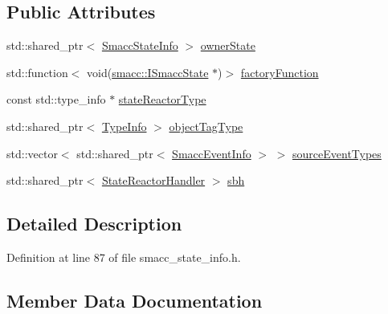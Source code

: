 \subsection*{Public Attributes}
\begin{DoxyCompactItemize}
\item 
std\+::shared\+\_\+ptr$<$ \hyperlink{classsmacc_1_1introspection_1_1SmaccStateInfo}{Smacc\+State\+Info} $>$ \hyperlink{structsmacc_1_1introspection_1_1SmaccStateReactorInfo_a7f79a42095ce284939ca47fb25a14101}{owner\+State}
\item 
std\+::function$<$ void(\hyperlink{classsmacc_1_1ISmaccState}{smacc\+::\+I\+Smacc\+State} $\ast$)$>$ \hyperlink{structsmacc_1_1introspection_1_1SmaccStateReactorInfo_a07d93f820f191aa3f9811fc2e1792b7a}{factory\+Function}
\item 
const std\+::type\+\_\+info $\ast$ \hyperlink{structsmacc_1_1introspection_1_1SmaccStateReactorInfo_a02de210fcdffd81424537d4d8a330609}{state\+Reactor\+Type}
\item 
std\+::shared\+\_\+ptr$<$ \hyperlink{classsmacc_1_1introspection_1_1TypeInfo}{Type\+Info} $>$ \hyperlink{structsmacc_1_1introspection_1_1SmaccStateReactorInfo_ae76d3acd0f68e75051ed002f10539738}{object\+Tag\+Type}
\item 
std\+::vector$<$ std\+::shared\+\_\+ptr$<$ \hyperlink{structsmacc_1_1introspection_1_1SmaccEventInfo}{Smacc\+Event\+Info} $>$ $>$ \hyperlink{structsmacc_1_1introspection_1_1SmaccStateReactorInfo_a66cb20b15e0ad0fbfd5ad20b83462eb6}{source\+Event\+Types}
\item 
std\+::shared\+\_\+ptr$<$ \hyperlink{classsmacc_1_1introspection_1_1StateReactorHandler}{State\+Reactor\+Handler} $>$ \hyperlink{structsmacc_1_1introspection_1_1SmaccStateReactorInfo_a6a112865af683d44f4eb824f54656a26}{sbh}
\end{DoxyCompactItemize}


\subsection{Detailed Description}


Definition at line 87 of file smacc\+\_\+state\+\_\+info.\+h.



\subsection{Member Data Documentation}
